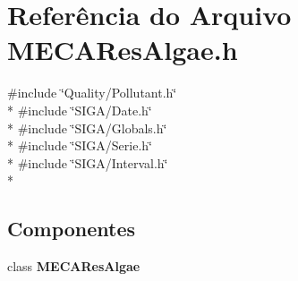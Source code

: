 \section{Referência do Arquivo M\+E\+C\+A\+Res\+Algae.\+h}
\label{_m_e_c_a_res_algae_8h}
{\ttfamily \#include \char`\"{}Quality/\+Pollutant.\+h\char`\"{}}\\*
{\ttfamily \#include \char`\"{}S\+I\+G\+A/\+Date.\+h\char`\"{}}\\*
{\ttfamily \#include \char`\"{}S\+I\+G\+A/\+Globals.\+h\char`\"{}}\\*
{\ttfamily \#include \char`\"{}S\+I\+G\+A/\+Serie.\+h\char`\"{}}\\*
{\ttfamily \#include \char`\"{}S\+I\+G\+A/\+Interval.\+h\char`\"{}}\\*
\subsection*{Componentes}
\begin{DoxyCompactItemize}
\item 
class {\bf M\+E\+C\+A\+Res\+Algae}
\end{DoxyCompactItemize}
